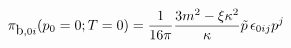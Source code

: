 \begin{equation}
{\cal{\pi}}_{\mbox{b}, 0i} (p_0=0;T=0) = \frac{1}{16 \pi} \frac{3
m^2 - \xi \kappa^2}{\kappa} \tilde{p}\, \epsilon_{0ij} p^j
\end{equation}

